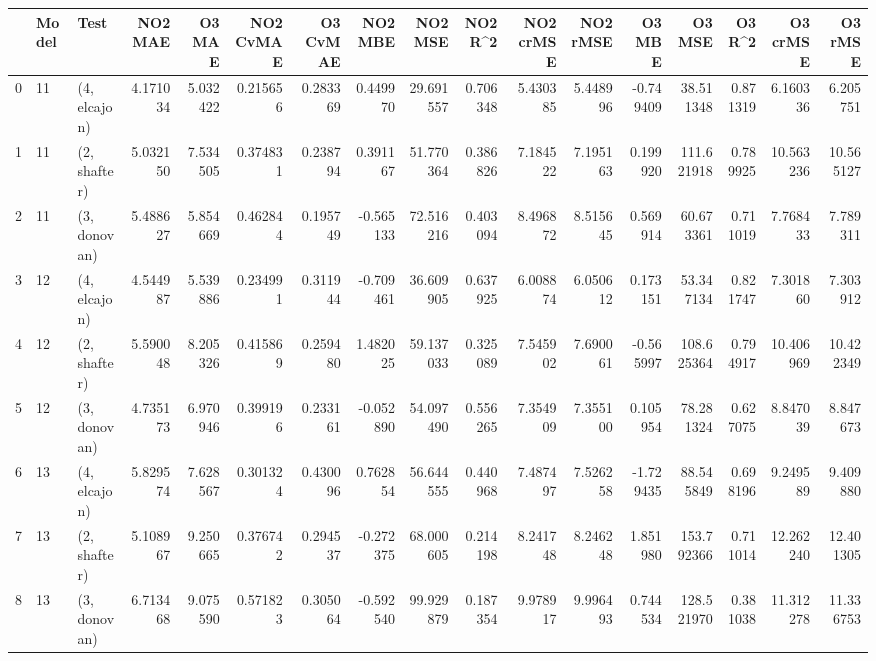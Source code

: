 \begin{tabular}{lllrrrrrrrrrrrrrr}
\toprule
{} & Model &          Test &    NO2 MAE &     O3 MAE &  NO2 CvMAE &  O3 CvMAE &    NO2 MBE &     NO2 MSE &   NO2 R\textasciicircum2 &  NO2 crMSE &   NO2 rMSE &     O3 MBE &      O3 MSE &    O3 R\textasciicircum2 &   O3 crMSE &    O3 rMSE \\
\midrule
0  &    11 &  (4, elcajon) &   4.171034 &   5.032422 &   0.215656 &  0.283369 &   0.449970 &   29.691557 &  0.706348 &   5.430385 &   5.448996 &  -0.749409 &   38.511348 &  0.871319 &   6.160336 &   6.205751 \\
1  &    11 &  (2, shafter) &   5.032150 &   7.534505 &   0.374831 &  0.238794 &   0.391167 &   51.770364 &  0.386826 &   7.184522 &   7.195163 &   0.199920 &  111.621918 &  0.789925 &  10.563236 &  10.565127 \\
2  &    11 &  (3, donovan) &   5.488627 &   5.854669 &   0.462844 &  0.195749 &  -0.565133 &   72.516216 &  0.403094 &   8.496872 &   8.515645 &   0.569914 &   60.673361 &  0.711019 &   7.768433 &   7.789311 \\
3  &    12 &  (4, elcajon) &   4.544987 &   5.539886 &   0.234991 &  0.311944 &  -0.709461 &   36.609905 &  0.637925 &   6.008874 &   6.050612 &   0.173151 &   53.347134 &  0.821747 &   7.301860 &   7.303912 \\
4  &    12 &  (2, shafter) &   5.590048 &   8.205326 &   0.415869 &  0.259480 &   1.482025 &   59.137033 &  0.325089 &   7.545902 &   7.690061 &  -0.565997 &  108.625364 &  0.794917 &  10.406969 &  10.422349 \\
5  &    12 &  (3, donovan) &   4.735173 &   6.970946 &   0.399196 &  0.233161 &  -0.052890 &   54.097490 &  0.556265 &   7.354909 &   7.355100 &   0.105954 &   78.281324 &  0.627075 &   8.847039 &   8.847673 \\
6  &    13 &  (4, elcajon) &   5.829574 &   7.628567 &   0.301324 &  0.430096 &   0.762854 &   56.644555 &  0.440968 &   7.487497 &   7.526258 &  -1.729435 &   88.545849 &  0.698196 &   9.249589 &   9.409880 \\
7  &    13 &  (2, shafter) &   5.108967 &   9.250665 &   0.376742 &  0.294537 &  -0.272375 &   68.000605 &  0.214198 &   8.241748 &   8.246248 &   1.851980 &  153.792366 &  0.711014 &  12.262240 &  12.401305 \\
8  &    13 &  (3, donovan) &   6.713468 &   9.075590 &   0.571823 &  0.305064 &  -0.592540 &   99.929879 &  0.187354 &   9.978917 &   9.996493 &   0.744534 &  128.521970 &  0.381038 &  11.312278 &  11.336753 \\

\end{tabular}
